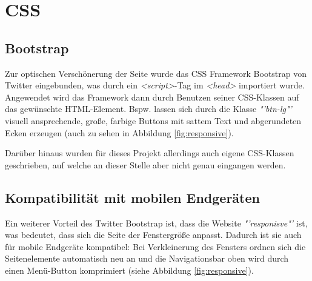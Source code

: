 \section{CSS}
\label{CSS}
\subsection{Bootstrap}
\label{Bootstrap}
Zur optischen Verschönerung der Seite wurde das CSS Framework Bootstrap von Twitter eingebunden, was durch ein \textit{<script>}-Tag im \textit{<head>} importiert wurde. Angewendet wird das Framework dann durch Benutzen seiner CSS-Klassen auf das gewünschte HTML-Element. Bspw. lassen sich durch die Klasse \textit{"'btn-lg"'} visuell ansprechende, große, farbige Buttons mit sattem Text und abgerundeten Ecken erzeugen (auch zu sehen in Abbildung \vref{fig:responsive}).
\par
Darüber hinaus wurden für dieses Projekt allerdings auch eigene CSS-Klassen geschrieben, auf welche an dieser Stelle aber nicht genau eingangen werden.

\subsection{Kompatibilität mit mobilen Endgeräten}
\label{Kompatibilität mit mobilen Endgeräten}
Ein weiterer Vorteil des Twitter Bootstrap ist, dass die Website \textit{"'responisve"'} ist, was bedeutet, dass sich die Seite der Fenstergröße anpasst. Dadurch ist sie auch für mobile Endgeräte kompatibel: Bei Verkleinerung des Fensters ordnen sich die Seitenelemente automatisch neu an und die Navigationsbar oben wird durch einen Menü-Button komprimiert (siehe Abbildung \vref{fig:responsive}).

